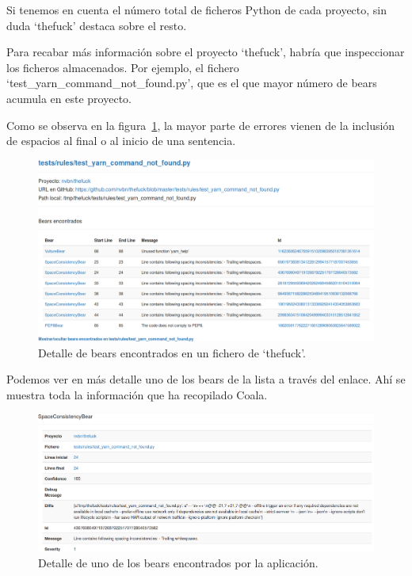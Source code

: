 \documentclass[a4paper, 12pt]{book}
\begin{document}
Si tenemos en cuenta el número total de ficheros Python de cada proyecto, sin duda `thefuck' destaca sobre el resto.

Para recabar más información sobre el proyecto `thefuck', habría que inspeccionar los ficheros almacenados. Por ejemplo, el fichero `test\_yarn\_command\_not\_found.py', que es el que mayor número de bears acumula en este proyecto.

Como se observa en la figura~\ref{fig:ficheroTheFuck}, la mayor parte de errores vienen de la inclusión de espacios al final o al inicio de una sentencia. 

\begin{figure}[H]
  \centering
  \includegraphics[width=15cm, keepaspectratio]{img/ficheroTheFuck}
  \caption{Detalle de bears encontrados en un fichero de `thefuck'.}
  \label{fig:ficheroTheFuck}
\end{figure}

Podemos ver en más detalle uno de los bears de la lista a través del enlace. Ahí se muestra toda la información que ha recopilado Coala.

\begin{figure}[H]
  \centering
  \includegraphics[width=17cm, keepaspectratio]{img/bearData}
  \caption{Detalle de uno de los bears encontrados por la aplicación.}
  \label{fig:bearData}
\end{figure}
\end{document}
